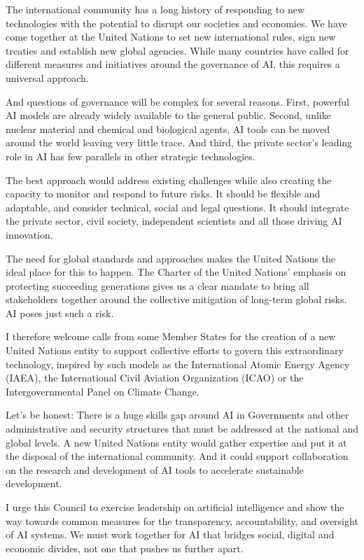 {The international community has a long history of responding to new technologies with the potential to disrupt our societies and economies. We have come together at the United Nations to set new international rules, sign new treaties and establish new global agencies. While many countries have called for different measures and initiatives around the governance of AI, this requires a universal approach.\par
And questions of governance will be complex for several reasons. First, powerful AI models are already widely available to the general public. Second, unlike nuclear material and chemical and biological agents, AI tools can be moved around the world leaving very little trace. And third, the private sector’s leading role in AI has few parallels in other strategic technologies.\par
[…] The best approach would address existing challenges while also creating the capacity to monitor and respond to future risks. It should be flexible and adaptable, and consider technical, social and legal questions. It should integrate the private sector, civil society, independent scientists and all those driving AI innovation.\par
The need for global standards and approaches makes the United Nations the ideal place for this to happen. The Charter of the United Nations’ emphasis on protecting succeeding generations gives us a clear mandate to bring all stakeholders together around the collective mitigation of long-term global risks. AI poses just such a risk.\par
I therefore welcome calls from some Member States for the creation of a new United Nations entity to support collective efforts to govern this extraordinary technology, inspired by such models as the International Atomic Energy Agency (IAEA), the International Civil Aviation Organization (ICAO) or the Intergovernmental Panel on Climate Change.\par
[…] Let’s be honest: There is a huge skills gap around AI in Governments and other administrative and security structures that must be addressed at the national and global levels. A new United Nations entity would gather expertise and put it at the disposal of the international community. And it could support collaboration on the research and development of AI tools to accelerate sustainable development.\par
[…] I urge this Council to exercise leadership on artificial intelligence and show the way towards common measures for the transparency, accountability, and oversight of AI systems. We must work together for AI that bridges social, digital and economic divides, not one that pushes us further apart.\par
}

